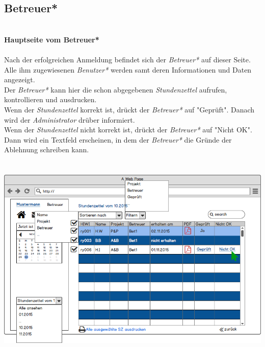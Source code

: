 \subsection{Betreuer*}
\textbf{\\Hauptseite vom Betreuer*}\\
\\
Nach der erfolgreichen Anmeldung befindet sich der \emph{Betreuer*} auf dieser Seite.\\
Alle ihm zugewiesenen \emph{Benutzer*} werden samt deren Informationen und Daten angezeigt.\\
Der \emph{Betreuer*} kann hier die schon abgegebenen \emph{Stundenzettel} aufrufen, kontrollieren und ausdrucken.\\
Wenn der \emph{Stundenzettel} korrekt ist, drückt der \emph{Betreuer*} auf "Geprüft". Danach wird der \emph{Administrator} drüber informiert.\\
Wenn der \emph{Stundenzettel} nicht korrekt ist, drückt der \emph{Betreuer*} auf "Nicht OK". Dann wird ein Textfeld erscheinen, in dem der \emph{Betreuer*} die Gründe der Ablehnung schreiben kann.\\
\\
\\
\includegraphics[width=\linewidth]{UI/Betreuer/Hauptseite.png}

